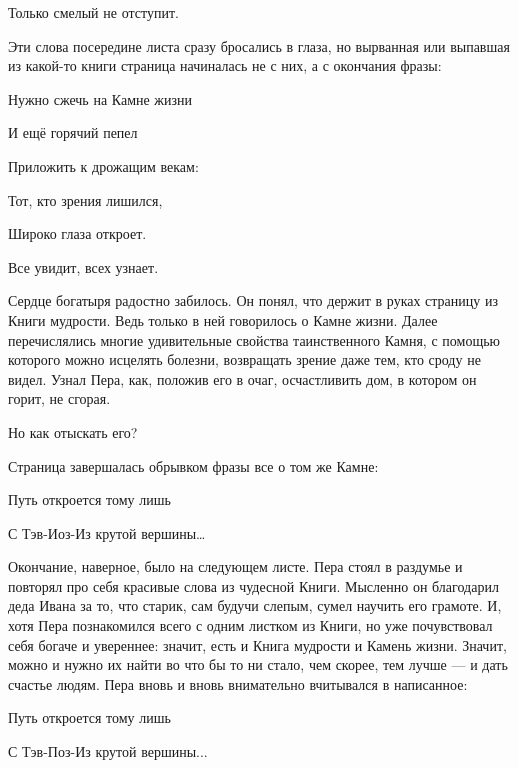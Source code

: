 \documentclass[12pt, a4paper, openany]{book}
\begin{document}
\qquad \qquad \qquad \qquad 	Только смелый не отступит.
	
	
	
	
	Эти слова посередине листа сразу бросались в глаза, но вырванная или выпавшая из какой-то книги страница начиналась не с них, а с окончания фразы:
	
	
	
	
\qquad \qquad \qquad \qquad 	Нужно сжечь на Камне жизни
	
\qquad \qquad \qquad \qquad 	И ещё горячий пепел
	
\qquad \qquad \qquad \qquad 	Приложить к дрожащим векам:
	
\qquad \qquad \qquad \qquad 	Тот, кто зрения лишился,
	
\qquad \qquad \qquad \qquad 	Широко глаза откроет.
	
\qquad \qquad \qquad \qquad 	Все увидит, всех узнает.
	
	
	
	
	Сердце богатыря радостно забилось. Он понял, что держит в руках страницу из Книги мудрости. Ведь только в ней говорилось о Камне жизни. Далее перечислялись многие удивительные свойства таинственного Камня, с помощью которого можно исцелять болезни, возвращать зрение даже тем, кто сроду не видел. Узнал Пера, как, положив его в очаг, осчастливить дом, в котором он горит, не сгорая.
	
	Но как отыскать его?
	
	Страница завершалась обрывком фразы все о том же Камне:
	
	
	
	
\qquad \qquad \qquad \qquad 	Путь откроется тому лишь
	
\qquad \qquad \qquad \qquad 	С Тэв-Иоз-Из крутой вершины…
	
	
	
	
	Окончание, наверное, было на следующем листе. Пера стоял в раздумье и повторял про себя красивые слова из чудесной Книги. Мысленно он благодарил деда Ивана за то, что старик, сам будучи слепым, сумел научить его грамоте. И, хотя Пера познакомился всего с одним листком из Книги, но уже почувствовал себя богаче и увереннее: значит, есть и Книга мудрости и Камень жизни. Значит, можно и нужно их найти во что бы то ни стало, чем скорее, тем лучше — и дать счастье людям. Пера вновь и вновь внимательно вчитывался в написанное:
	
	
	
	
\qquad \qquad \qquad \qquad 	Путь откроется тому лишь
	
\qquad \qquad \qquad \qquad 	С Тэв-Поз-Из крутой вершины...
	
\end{document}
